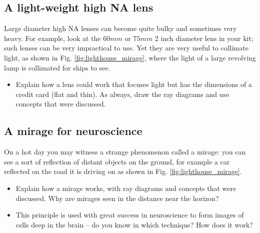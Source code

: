 \documentclass[a4paper]{report}
\begin{document}
    \subsection{A light-weight high NA lens}
	\hypertarget{hintBack-fresnel}{}
	
	Large diameter high NA lenses can become quite bulky and sometimes very heavy. For example, look at the $60mm$ or $75mm$ 2 inch diameter lens in your kit; such lenses can be very impractical to use. Yet they are very useful to collimate light, as shown in Fig. \ref{fig:lighthouse_mirage}, where the light of a large revolving lamp is collimated for ships to see.
	
	\begin{itemize}
	    \item Explain how a lens could work that focuses light but has the dimensions of a credit card (flat and thin). As always, draw the ray diagrams and use concepts that were discussed.
	\end{itemize}


	

    \subsection{A mirage for neuroscience}
	\hypertarget{hintBack-mirage}{}
	
	On a hot day you may witness a strange phenomenon called a mirage: you can see a sort of reflection of distant objects on the ground, for example a car reflected on the road it is driving on as shown in Fig. \ref{fig:lighthouse_mirage}. 
	
	\begin{itemize}
	    \item Explain how a mirage works, with ray diagrams and concepts that were discussed. Why are mirages seen in the distance near the horizon?
	    \item This principle is used with great success in neuroscience to form images of cells deep in the brain -- do you know in which technique? How does it work?
	\end{itemize}

	
	
\end{document}
